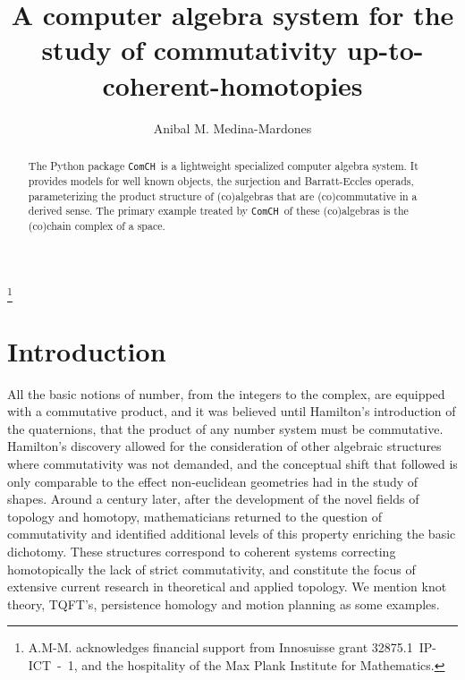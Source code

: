\documentclass{amsart}
\newcommand{\comch}{\texttt{ComCH }}
\begin{document}
\title[A C.A.S. for the study of commutativity up-to-coherent-homotopies]{A computer algebra system for the study of commutativity up-to-coherent-homotopies}
\author{Anibal M. Medina-Mardones}
\address{Max Plank Institute for Mathematics, Bonn, Germany}
\address{Department of Mathematics, University of Notre Dame, Notre Dame, IN, USA}
\thanks{A.M-M. acknowledges financial support from Innosuisse grant \mbox{32875.1 IP-ICT - 1}, and the hospitality of the Max Plank Institute for Mathematics.}

\begin{abstract}
	The Python package \comch is a lightweight specialized computer algebra system. It provides models for well known objects, the surjection and Barratt-Eccles operads, parameterizing the product structure of (co)algebras that are (co)commutative in a derived sense. The primary example treated by \comch of these (co)algebras is the (co)chain complex of a space.
\end{abstract} 

\maketitle

\section{Introduction}

All the basic notions of number, from the integers to the complex, are equipped with a commutative product, and it was believed until Hamilton's introduction of the quaternions, that the product of any number system must be commutative. Hamilton's discovery allowed for the consideration of other algebraic structures where commutativity was not demanded, and the conceptual shift that followed is only comparable to the effect non-euclidean geometries had in the study of shapes. Around a century later, after the development of the novel fields of topology and homotopy, mathematicians returned to the question of commutativity and identified additional levels of this property enriching the basic dichotomy. These structures correspond to coherent systems correcting homotopically the lack of strict commutativity, and constitute the focus of extensive current research in theoretical and applied topology. We mention knot theory, TQFT's, persistence homology and motion planning as some examples.
\end{document}
